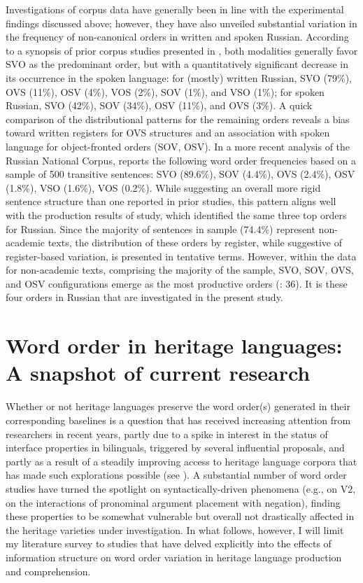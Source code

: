 \documentclass[output=paper]{langscibook}
\begin{document}
Investigations of corpus data have generally been in line with the experimental findings discussed above; however, they have also unveiled substantial variation in the frequency of non-canonical orders in written and spoken Russian. According to a synopsis of prior corpus studies presented in \citet[260]{MillerWeinert1998}, both modalities generally favor SVO as the predominant order, but with a quantitatively significant decrease in its occurrence in the spoken language: for (mostly) written Russian, SVO (79\%), OVS (11\%), OSV (4\%), VOS (2\%), SOV (1\%), and VSO (1\%); for spoken Russian, SVO (42\%), SOV (34\%), OSV (11\%), and OVS (3\%). A quick comparison of the distributional patterns for the remaining orders reveals a bias toward written registers for OVS structures and an association with spoken language for object-fronted orders (SOV, OSV). In a more recent analysis of the Russian National Corpus, \citet{Billings2015} reports the following word order frequencies based on a sample of 500 transitive sentences: SVO (89.6\%), SOV (4.4\%), OVS (2.4\%), OSV (1.8\%), VSO (1.6\%), VOS (0.2\%). While suggesting an overall more rigid sentence structure than one reported in prior studies, this pattern aligns well with the production results of  study, which identified the same three top orders for Russian. Since the majority of sentences in  sample (74.4\%) represent non-academic texts, the distribution of these orders by register, while suggestive of register-based variation, is presented in tentative terms. However, within the data for non-academic texts, comprising the majority of the sample, SVO, SOV, OVS, and OSV configurations emerge as the most productive orders (\citealt{Billings2015}: 36). It is these four orders in Russian that are investigated in the present study.

\section{Word order in heritage languages: A snapshot of current research}\label{sec:laleko:3}

Whether or not heritage languages preserve the word order(s) generated in their corresponding baselines is a question that has received increasing attention from researchers in recent years, partly due to a spike in interest in the status of interface properties in bilinguals, triggered by several influential proposals, and partly as a result of a steadily improving access to heritage language corpora that has made such explorations possible (see \citealt{Kisselev2021}). A substantial number of word order studies have turned the spotlight on syntactically-driven phenomena (e.g., \citealt{HoppPutnam2015, KühlPetersen2018, WestergaardLohndal2019} on V2, \citealt{AnderssenWestergaard2020} on the interactions of pronominal argument placement with negation), finding these properties to be somewhat vulnerable but overall not drastically affected in the heritage varieties under investigation. In what follows, however, I will limit my literature survey to studies that have delved explicitly into the effects of information structure on word order variation in heritage language production and comprehension.
\end{document}
